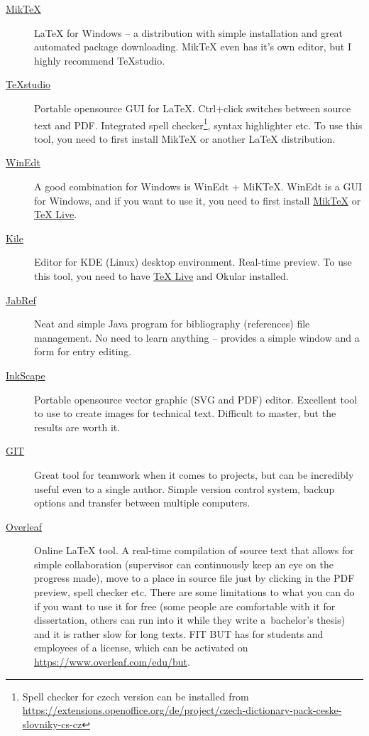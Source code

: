 \begin{description}
	\item[\href{http://miktex.org/download}{MikTeX}] \LaTeX{} for Windows -- a distribution with simple installation and great automated package downloading. MikTeX even has it's own editor, but I highly recommend TeXstudio.
	\item[\href{http://texstudio.sourceforge.net/}{TeXstudio}] Portable opensource GUI for \LaTeX{}. Ctrl+click switches between source text and PDF. Integrated spell checker\footnote{Spell checker for czech version can be installed from \url{https://extensions.openoffice.org/de/project/czech-dictionary-pack-ceske-slovniky-cs-cz}}, syntax highlighter etc. To use this tool, you need to first install MikTeX or another \LaTeX{} distribution.
    \item[\href{http://www.winedt.com/}{WinEdt}] A good combination for Windows is WinEdt + MiKTeX. WinEdt is a GUI for Windows, and if you want to use it, you need to first install \href{http://miktex.org/download}{MikTeX} or \href{http://www.tug.org/texlive/}{TeX Live}.
    \item[\href{http://kile.sourceforge.net/}{Kile}] Editor for KDE (Linux) desktop environment. Real-time preview. To use this tool, you need to have \href{http://www.tug.org/texlive/}{TeX Live} and Okular installed.
	\item[\href{http://jabref.sourceforge.net/download.php}{JabRef}] Neat and simple Java program for bibliography (references) file management. No need to learn anything -- provides a simple window and a form for entry editing.
	\item[\href{https://inkscape.org/en/download/}{InkScape}] Portable opensource vector graphic (SVG and PDF) editor. Excellent tool to use to create images for technical text. Difficult to master, but the results are worth it.
	\item[\href{https://git-scm.com/}{GIT}] Great tool for teamwork when it comes to projects, but can be incredibly useful even to a single author. Simple version control system, backup options and transfer between multiple computers.
	\item[\href{http://www.overleaf.com/}{Overleaf}] Online \LaTeX{} tool. A real-time compilation of source text that allows for simple collaboration (supervisor can continuously keep an eye on the progress made), move to a place in source file just by clicking in the PDF preview, spell checker etc. There are some limitations to what you can do if you want to use it for free (some people are comfortable with it for dissertation, others can run into it while they write a~bachelor's thesis) and it is rather slow for long texts. FIT BUT has for students and employees of a license, which can be activated on \url{https://www.overleaf.com/edu/but}.
\end{description}

